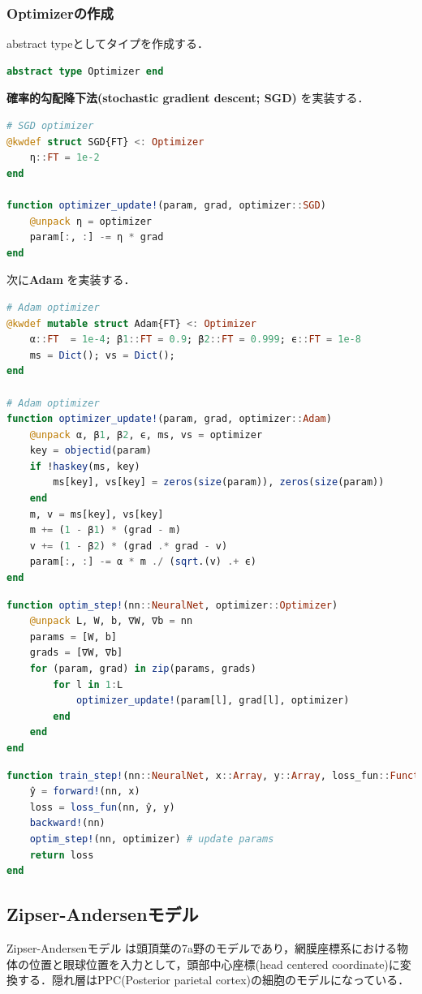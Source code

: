 \subsubsection{Optimizerの作成}
abstract typeとしてタイプを作成する．
\begin{lstlisting}[language=julia]
abstract type Optimizer end
\end{lstlisting}
\textbf{確率的勾配降下法(stochastic gradient descent; SGD)} を実装する．
\begin{lstlisting}[language=julia]
# SGD optimizer
@kwdef struct SGD{FT} <: Optimizer
    η::FT = 1e-2
end

function optimizer_update!(param, grad, optimizer::SGD)
    @unpack η = optimizer
    param[:, :] -= η * grad
end
\end{lstlisting}
次に\textbf{Adam} \citep{Kingma2014-fm} を実装する．
\begin{lstlisting}[language=julia]
# Adam optimizer
@kwdef mutable struct Adam{FT} <: Optimizer
    α::FT  = 1e-4; β1::FT = 0.9; β2::FT = 0.999; ϵ::FT = 1e-8
    ms = Dict(); vs = Dict();
end

# Adam optimizer
function optimizer_update!(param, grad, optimizer::Adam)
    @unpack α, β1, β2, ϵ, ms, vs = optimizer
    key = objectid(param)
    if !haskey(ms, key) 
        ms[key], vs[key] = zeros(size(param)), zeros(size(param))
    end    
    m, v = ms[key], vs[key]
    m += (1 - β1) * (grad - m)
    v += (1 - β2) * (grad .* grad - v)
    param[:, :] -= α * m ./ (sqrt.(v) .+ ϵ)
end
\end{lstlisting}
\begin{lstlisting}[language=julia]
function optim_step!(nn::NeuralNet, optimizer::Optimizer)
    @unpack L, W, b, ∇W, ∇b = nn
    params = [W, b]
    grads = [∇W, ∇b]
    for (param, grad) in zip(params, grads)
        for l in 1:L
            optimizer_update!(param[l], grad[l], optimizer)
        end
    end
end
\end{lstlisting}
\begin{lstlisting}[language=julia]
function train_step!(nn::NeuralNet, x::Array, y::Array, loss_fun::Function, optimizer::Optimizer=SGD())
    ŷ = forward!(nn, x)
    loss = loss_fun(nn, ŷ, y)
    backward!(nn)
    optim_step!(nn, optimizer) # update params
    return loss
end
\end{lstlisting}
\subsection{Zipser-Andersenモデル}
Zipser-Andersenモデル \citep{Zipser1988-nc} は頭頂葉の7a野のモデルであり，網膜座標系における物体の位置と眼球位置を入力として，頭部中心座標(head centered coordinate)に変換する．隠れ層はPPC(Posterior parietal cortex)の細胞のモデルになっている．
